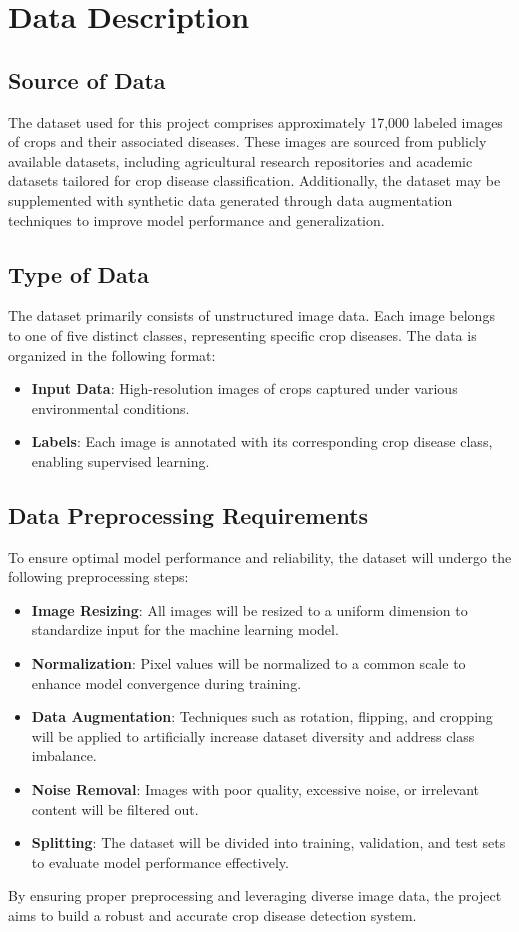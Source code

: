 \section{Data Description}
\subsection{Source of Data}
The dataset used for this project comprises approximately 17,000 labeled images of crops and their associated diseases. These images are sourced from publicly available datasets, including agricultural research repositories and academic datasets tailored for crop disease classification. Additionally, the dataset may be supplemented with synthetic data generated through data augmentation techniques to improve model performance and generalization.

\subsection{Type of Data}
The dataset primarily consists of unstructured image data. Each image belongs to one of five distinct classes, representing specific crop diseases. The data is organized in the following format:
\begin{itemize}
    \item \textbf{Input Data}: High-resolution images of crops captured under various environmental conditions.
    \item \textbf{Labels}: Each image is annotated with its corresponding crop disease class, enabling supervised learning.
\end{itemize}

\subsection{Data Preprocessing Requirements}
To ensure optimal model performance and reliability, the dataset will undergo the following preprocessing steps:
\begin{itemize}
    \item \textbf{Image Resizing}: All images will be resized to a uniform dimension to standardize input for the machine learning model.
    \item \textbf{Normalization}: Pixel values will be normalized to a common scale to enhance model convergence during training.
    \item \textbf{Data Augmentation}: Techniques such as rotation, flipping, and cropping will be applied to artificially increase dataset diversity and address class imbalance.
    \item \textbf{Noise Removal}: Images with poor quality, excessive noise, or irrelevant content will be filtered out.
    \item \textbf{Splitting}: The dataset will be divided into training, validation, and test sets to evaluate model performance effectively.
\end{itemize}

By ensuring proper preprocessing and leveraging diverse image data, the project aims to build a robust and accurate crop disease detection system.
